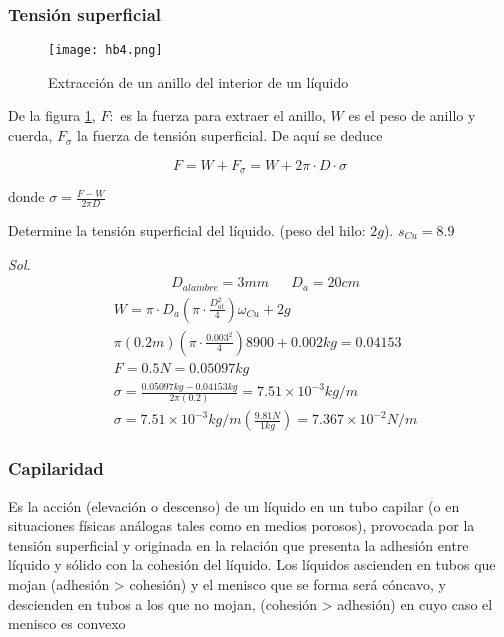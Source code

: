\subsubsection{Tensión superficial}

\begin{figure}[h!]
  \centerline{\texttt{[image: hb4.png]}}
  \caption{Extracción de un anillo del interior de un líquido}
  \label{hb4}
\end{figure}

De la figura \ref{hb4}, $F:$ es la fuerza para extraer el anillo, $W$ es el peso de anillo y cuerda, $F_{\sigma}$ la fuerza de tensión superficial. De aquí se deduce

\begin{equation}
    F=W+F_{\sigma}=W+2\pi\cdot D\cdot \sigma
\end{equation}

donde $\sigma=\frac{F-W}{2\pi D}$

\begin{problem}
    Determine la tensión superficial del líquido. (peso del hilo: $2g$). $s_{Cu}=8.9$
\end{problem}

\textit{ Sol. }
\begin{align*}
    &D_{alambre}=3mm&&D_{a}=20cm
\end{align*}
\begin{align*}
    &W=\pi\cdot D_{a}\left(\pi\cdot \frac{D^2_{at}}{4}\right)\omega_{Cu}+2g\\
    &\pi(0.2m)\left(\pi\cdot \frac{0.003^2}{4}\right)8900+0.002kg=0.04153\\
    &F=0.5N=0.05097kg\\
    &\sigma=\frac{0.05097kg-0.04153kg}{2\pi(0.2)}=7.51\times 10^{-3}kg/m\\
    &\sigma=7.51\times 10^{-3}kg/m\left(\frac{9.81N}{1kg}\right)=7.367\times 10^{-2}N/m
\end{align*}

\subsubsection{Capilaridad}

\begin{definition}[Capilaridad]
    Es la acción (elevación o descenso) de un líquido en  un tubo capilar (o en situaciones físicas análogas tales como en medios porosos), provocada por la tensión superficial y originada en la relación que presenta la adhesión entre líquido y sólido con la cohesión del líquido. Los líquidos ascienden en tubos que mojan (adhesión > cohesión) y el menisco que se forma será cóncavo, y descienden en tubos a los que no mojan, (cohesión > adhesión) en cuyo caso el menisco es convexo
\end{definition}

